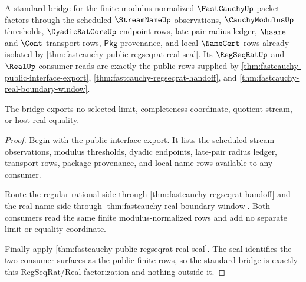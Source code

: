 \begin{theorem}
\label{thm:fastcauchy-standard-regseqrat-real-bridge}
A standard bridge for the finite modulus-normalized $\FastCauchyUp$ packet
factors through the scheduled $\StreamNameUp$ observations,
$\CauchyModulusUp$ thresholds, $\DyadicRatCoreUp$ endpoint rows, late-pair
radius ledger, $\hsame$ and $\Cont$ transport rows, $\mathsf{Pkg}$ provenance,
and local $\NameCert$ rows already isolated by
\autoref{thm:fastcauchy-public-regseqrat-real-seal}. Its $\RegSeqRatUp$ and
$\RealUp$ consumer reads are exactly the public rows supplied by
\autoref{thm:fastcauchy-public-interface-export},
\autoref{thm:fastcauchy-regseqrat-handoff}, and
\autoref{thm:fastcauchy-real-boundary-window}.

The bridge exports no selected limit, completeness coordinate, quotient
stream, or host real equality.
\end{theorem}
\begin{proof}
Begin with the public interface export. It lists the scheduled stream
observations, modulus thresholds, dyadic endpoints, late-pair radius ledger,
transport rows, package provenance, and local name rows available to any
consumer.

Route the regular-rational side through
\autoref{thm:fastcauchy-regseqrat-handoff} and the real-name side through
\autoref{thm:fastcauchy-real-boundary-window}. Both consumers read the same
finite modulus-normalized rows and add no separate limit or equality
coordinate.

Finally apply \autoref{thm:fastcauchy-public-regseqrat-real-seal}. The seal
identifies the two consumer surfaces as the public finite rows, so the standard
bridge is exactly this RegSeqRat/Real factorization and nothing outside it.
\end{proof}

